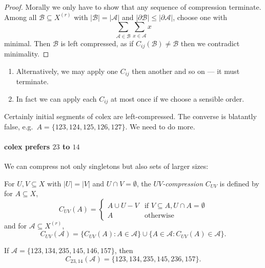 \documentclass[a4paper]{article}
\newcommand{\shadow}{\partial}
\begin{document}
\begin{proof}
  Morally we only have to show that any sequence of compression terminate. Among all \(\mathcal B \subseteq X^{(r)}\) with \(|\mathcal B| = |\mathcal A|\) and \(|\shadow \mathcal B| \leq |\shadow \mathcal A|\), choose one with
  \[
    \sum_{\mathcal A \in \mathcal B} \sum_{x \in \mathcal A} x
  \]
  minimal. Then \(\mathcal B\) is left compressed, as if \(C_{ij}(\mathcal B) \neq \mathcal B\) then we contradict minimality.
\end{proof}

\begin{note}\leavevmode
  \begin{enumerate}
  \item Alternatively, we may apply one \(C_{ij}\) then another and so on --- it must terminate.
  \item In fact we can apply each \(C_{ij}\) at most once if we choose a sensible order.
  \end{enumerate}
\end{note}

Certainly initial segments of colex are left-compressed. The converse is blatantly false, e.g.\ \(A = \{123, 124, 125, 126, 127\}\). We need to do more.

\paragraph{colex prefers \(23\) to \(14\)}

We can compress not only singletons but also sets of larger sizes:

\begin{definition}[\(UV\)-compression]
  For \(U, V \subseteq X\) with \(|U| = |V|\) and \(U \cap V = \emptyset\), the \emph{\(UV\)-compression} \(C_{UV}\) is defined by for \(A \subseteq X\),
  \[
    C_{UV} (A) =
    \begin{cases}
      A \cup U - V & \text{if } V \subseteq A, U \cap A = \emptyset \\
      A & \text{otherwise}
    \end{cases}
  \]
  and for \(\mathcal A \subseteq X^{(r)}\),
  \[
    C_{UV} (\mathcal A) = \{C_{UV}(A): A \in \mathcal A\} \cup \{A \in \mathcal A: C_{UV}(A) \in \mathcal A\}.
  \]
\end{definition}

\begin{eg}
  If \(\mathcal A = \{123, 134, 235, 145, 146, 157\}\), then
  \[
    C_{23, 14}(\mathcal A) = \{123, 134, 235, 145, 236, 157\}.
  \]
\end{eg}
\end{document}
